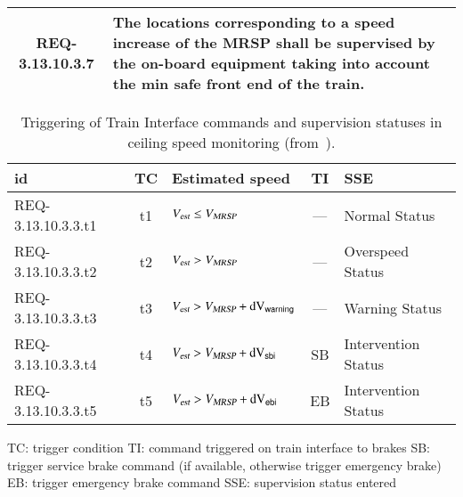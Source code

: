 \begin{table}[htdp]
\begin{center}
\begin{tabular}{|c|p{130mm}|}
\\\hline
REQ-3.13.10.3.7&
The locations corresponding to a speed increase of the MRSP shall be supervised by the on-board equipment taking into account the min safe front end of the train.
\\\hline\hline
\end{tabular}
\normalsize
\end{center}
\label{tab:req}
\end{table}%
 
\begin{table}[htdp]
\caption{Triggering of Train Interface commands and supervision statuses in ceiling speed monitoring (from~\cite[Table~5]{ETCSSRS-Principles}).}
\begin{center}
\footnotesize
\begin{tabular}{|l|c|l|c|l|}
\hline\hline
{\bf id} & {\bf TC} & {\bf Estimated speed} & {\bf TI} & {\bf SSE} 
\\\hline\hline
REQ-3.13.10.3.3.t1 & t1 & ${V_{\text{\sl est}}} \le {V_{\text{\sl MRSP}}}$ & --- & Normal Status
\\\hline
REQ-3.13.10.3.3.t2 & t2 & ${V_{\text{\sl est}}} > {V_{\text{\sl MRSP}}}$ & --- & Overspeed Status
\\\hline
REQ-3.13.10.3.3.t3 & t3 & ${V_{\text{\sl est}}} > {V_{\text{\sl MRSP}}} + \text{dV}_{\mathsf{warning}}$ & --- & Warning Status
\\\hline
REQ-3.13.10.3.3.t4 & t4 & ${V_{\text{\sl est}}} > {V_{\text{\sl MRSP}}} + \text{dV}_{\mathsf{sbi}}$ & SB & Intervention Status
\\\hline
REQ-3.13.10.3.3.t5 & t5 & ${V_{\text{\sl est}}} > {V_{\text{\sl MRSP}}} + \text{dV}_{\mathsf{ebi}}$ & EB & Intervention Status  
\\\hline\hline
\end{tabular}
\normalsize
\end{center}

TC: trigger condition \newline
TI: command triggered on train interface to brakes \newline
SB: trigger service brake command (if available, otherwise trigger emergency brake)\newline
EB: trigger emergency brake command 
SSE: supervision status entered
\label{tab:five}
\end{table}%


